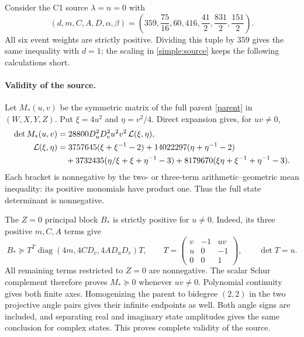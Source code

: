 Consider the C1 source $\lambda=n=0$ with
\begin{equation}
 (d,m,C,A,D,\alpha,\beta)
 =\left(359,\frac{75}{16},60,416,
              \frac{41}{2},\frac{831}{2},\frac{151}{2}\right).
 \label{simple:source}
\end{equation}
All six event weights are strictly positive. Dividing this tuple by $359$
gives the same inequality with $d=1$; the scaling in
\eqref{simple:source} keeps the following calculations short.

\paragraph{Validity of the source.}
Let $M_*(u,v)$ be the symmetric matrix of the full parent
\eqref{parent} in $(W,X,Y,Z)$. Put $\xi=4u^2$ and $\eta=v^2/4$.
Direct expansion gives, for $uv\ne0$,
\begin{align}
 \det M_*(u,v)
 &=28800D_u^2D_v^2u^2v^2\,\mathcal L(\xi,\eta),
 \label{simple:determinant}\\
 \mathcal L(\xi,\eta)
 &=3757645(\xi+\xi^{-1}-2)
   +14022297(\eta+\eta^{-1}-2)\notag\\
 &\quad+3732435(\eta/\xi+\xi+\eta^{-1}-3)
   +8179670(\xi\eta+\xi^{-1}+\eta^{-1}-3).
 \label{simple:balanced}
\end{align}
Each bracket is nonnegative by the two- or three-term arithmetic--geometric
mean inequality: its positive monomials have product one.
Thus the full state determinant is nonnegative.

The $Z=0$ principal block $B_*$ is strictly positive for $u\ne0$.
Indeed, its three positive $m,C,A$ terms give
\[
 B_*\succeq
 T^T\operatorname{diag}(4m,4CD_v,4AD_uD_v)T,
 \qquad
 T=\begin{pmatrix}v&-1&uv\\u&0&-1\\0&0&1\end{pmatrix},
 \qquad \det T=u.
\]
All remaining terms restricted to $Z=0$ are nonnegative.
The scalar Schur complement therefore proves $M_*\succeq0$ whenever
$uv\ne0$. Polynomial continuity gives both finite axes. Homogenizing
the parent to bidegree $(2,2)$ in the two projective angle pairs gives
their infinite endpoints as well. Both angle signs are included, and
separating real and imaginary state amplitudes gives the same conclusion
for complex states. This proves complete validity of the source.


